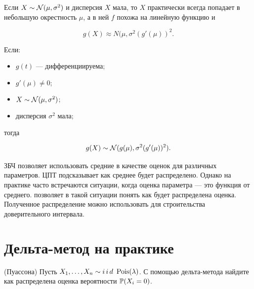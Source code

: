 \documentclass[12pt, a4paper, oneside]{article}
\begin{document}
Если $X \sim \mathcal{N}(\mu, \sigma^2)$ и  дисперсия $X$ мала, то $X$ практически всегда попадает в небольшую окрестность $\mu$, а в ней $f$ похожа на линейную функцию и 

$$
g(X) \approx N(\mu, \sigma^2 (g'(\mu))^2.
$$ 

 Если: 

\begin{itemize}
	\item  $g(t)$ --- дифференциируема;
	\item  $g'(\mu) \neq 0$;
	\item $X \sim \mathcal{N}(\mu,\sigma^2)$;
	\item дисперсия $\sigma^2$ мала;
\end{itemize} 

тогда 

$$
g(X) \sim \mathcal{N}(g(\mu),\sigma^2 (g'(\mu))^2).
$$


ЗБЧ позволяет использовать средние в качестве оценок для различных параметров. ЦПТ подсказывает как среднее будет распределено. Однако на практике часто встречаются ситуации, когда оценка параметра --- это функция от среднего.   позволяет в такой ситуации понять как будет распределена оценка. Полученное распределение можно использовать для строительства доверительного интервала. 


\section*{Дельта-метод на практике}



\begin{problem}{(Пуассона)}
Пусть $X_1, \ldots, X_n \sim i\,i\,d\,\, \operatorname{Pois}(\lambda)$.   С помощью дельта-метода найдите как распределена оценка вероятности $\mathbb{P}(X_i = 0)$.
\end{problem} 
\end{document}
